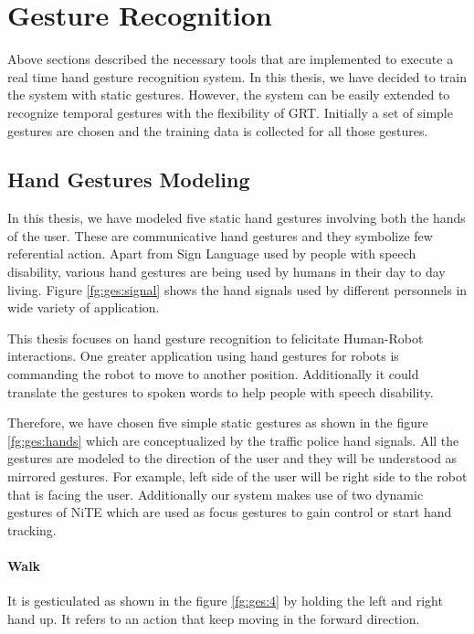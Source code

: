 \section{Gesture Recognition} Above sections described the necessary tools that are implemented to execute a real time hand gesture recognition system. In this thesis, we have decided to train the system with static gestures. However, the system can be easily extended to recognize temporal gestures with the flexibility of GRT. Initially a set of simple gestures are chosen and the training data is collected for all those gestures.

\subsection{Hand Gestures Modeling} In this thesis, we have modeled five static hand gestures involving both the hands of the user. These are communicative hand gestures and they symbolize few referential action. Apart from Sign Language used by people with speech disability, various hand gestures are being used by humans in their day to day living. Figure \ref{fg:ges:signal} shows the hand signals used by different personnels in wide variety of application.



This thesis focuses on hand gesture recognition to felicitate Human-Robot interactions. One greater application using hand gestures for robots is commanding the robot to move to another position. Additionally it could translate the gestures to spoken words to help people with speech disability. 



Therefore, we have chosen five simple static gestures as shown in the figure \ref{fg:ges:hands} which are conceptualized by the traffic police hand signals. All the gestures are modeled to the direction of the user and they will be understood as mirrored gestures. For example, left side of the user will be right side to the robot that is facing the user. Additionally our system makes use of two dynamic gestures of NiTE which are used as focus gestures to gain control or start hand tracking.

\paragraph*{Walk} It is gesticulated as shown in the figure \ref{fg:ges:4} by holding the left and right hand up. It refers to an action that keep moving in the forward direction.

